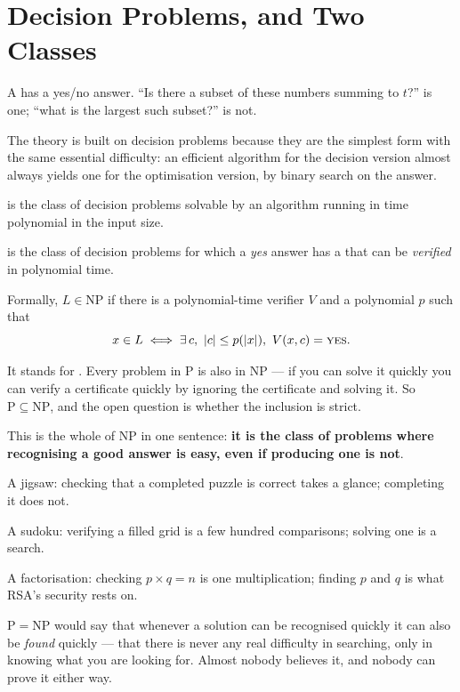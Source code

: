 \section{Decision Problems, and Two Classes}

\begin{definitionbox}
A  has a yes/no answer. ``Is there a subset of these
numbers summing to $t$?'' is one; ``what is the largest such subset?'' is not.

\smallskip
The theory is built on decision problems because they are the simplest form
with the same essential difficulty: an efficient algorithm for the decision
version almost always yields one for the optimisation version, by binary
search on the answer.
\end{definitionbox}

\begin{definitionbox}[P and NP]
 is the class of decision problems solvable by an algorithm running in
time polynomial in the input size.

\smallskip
{} is the class of decision problems for which a \emph{yes} answer has a
 that can be \emph{verified} in polynomial time.

\smallskip
Formally, $L \in \mathrm{NP}$ if there is a polynomial-time verifier $V$ and a
polynomial $p$ such that
\[ x \in L \iff \exists\, c,\ |c| \le p(|x|),\ V(x, c) = \textsc{yes}. \]
\end{definitionbox}

\begin{alertbox}
It stands for . Every problem in P is also in
NP --- if you can solve it quickly you can verify a certificate quickly by
ignoring the certificate and solving it. So $\mathrm{P} \subseteq \mathrm{NP}$,
and the open question is whether the inclusion is strict.
\end{alertbox}

\begin{conceptbox}
This is the whole of NP in one sentence: \textbf{it is the class of problems
where recognising a good answer is easy, even if producing one is not}.

\smallskip
\begin{tight}
  \item A jigsaw: checking that a completed puzzle is correct takes a glance;
        completing it does not.
  \item A sudoku: verifying a filled grid is a few hundred comparisons;
        solving one is a search.
  \item A factorisation: checking $p \times q = n$ is one multiplication;
        finding $p$ and $q$ is what RSA's security rests on.
\end{tight}

\smallskip
$\mathrm{P} = \mathrm{NP}$ would say that whenever a solution can be recognised
quickly it can also be \emph{found} quickly --- that there is never any real
difficulty in searching, only in knowing what you are looking for. Almost
nobody believes it, and nobody can prove it either way.
\end{conceptbox}

